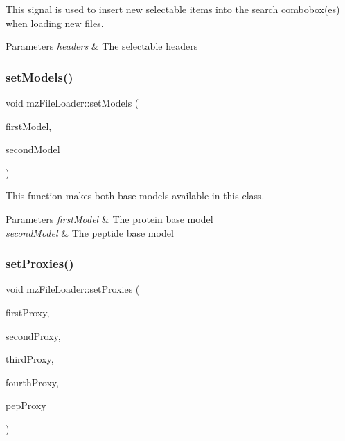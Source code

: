 This signal is used to insert new selectable items into the search combobox(es) when loading new files. 


\begin{DoxyParams}{Parameters}
{\em headers} & The selectable headers \\
\hline
\end{DoxyParams}
\mbox{\label{classmz_file_loader_a699254cd8dabbf7fda70f02aa06730f7}} 
\subsubsection{\texorpdfstring{set\+Models()}{setModels()}}
{\footnotesize\ttfamily void mz\+File\+Loader\+::set\+Models (\begin{DoxyParamCaption}\item[{Q\+Standard\+Item\+Model $\ast$}]{first\+Model,  }\item[{Q\+Standard\+Item\+Model $\ast$}]{second\+Model }\end{DoxyParamCaption})\hspace{0.3cm}{\ttfamily [inline]}}



This function makes both base models available in this class. 


\begin{DoxyParams}{Parameters}
{\em first\+Model} & The protein base model \\
\hline
{\em second\+Model} & The peptide base model \\
\hline
\end{DoxyParams}
\mbox{\label{classmz_file_loader_a515cf8ce62e8c7c235a62536e739cb9d}} 
\subsubsection{\texorpdfstring{set\+Proxies()}{setProxies()}}
{\footnotesize\ttfamily void mz\+File\+Loader\+::set\+Proxies (\begin{DoxyParamCaption}\item[{Q\+Sort\+Filter\+Proxy\+Model $\ast$}]{first\+Proxy,  }\item[{Q\+Sort\+Filter\+Proxy\+Model $\ast$}]{second\+Proxy,  }\item[{Q\+Sort\+Filter\+Proxy\+Model $\ast$}]{third\+Proxy,  }\item[{Q\+Sort\+Filter\+Proxy\+Model $\ast$}]{fourth\+Proxy,  }\item[{Q\+Sort\+Filter\+Proxy\+Model $\ast$}]{pep\+Proxy }\end{DoxyParamCaption})\hspace{0.3cm}{\ttfamily [inline]}}



